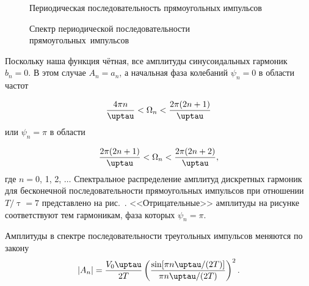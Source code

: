 
\begin{figure}[h!]
\begin{minipage}{0.45\textwidth}
	\caption{Периодическая последовательность прямоугольных импульсов}
\end{minipage}
\hfill
\begin{minipage}{0.45\textwidth}
	\caption{Спектр периодической последовательности прямоугольных~импульсов}
\end{minipage}
\end{figure}

Поскольку наша функция чётная, все амплитуды синусоидальных гармоник $b_n=0$. В этом случае $A_n=a_n$, а начальная фаза
колебаний $\psi_n=0$ в области частот

\begin{equation}
	\frac{4\pi n}{\uptau}<\Omega_n<\frac{2\pi (2n+1)}{\uptau}
	\eqmark{6.2.3}
\end{equation}
или $\psi_n=\pi$ в области

\begin{equation}
	\frac{2\pi(2n+1)}{\uptau} < \Omega_n < \frac{2\pi (2n+2)}{\uptau},
	\eqmark{6.2.4}
\end{equation}
где $n=0$, 1, 2, $\dots$ Спектральное распределение амплитуд дискретных гармоник для бесконечной последовательности прямоугольных импульсов при отношении $T/\uptau=7$ представлено на рис.~.
<<Отрицательные>> амплитуды на рисунке соответствуют тем гармоникам, фаза которых $\psi_n=\pi$.


Амплитуды в спектре последовательности треугольных импульсов меняются по закону
\begin{equation}
	|A_n|=\frac{V_0\uptau}{2T} \left(\frac{\sin[\pi n\uptau/(2T)]} {\pi n\uptau/(2T)}\right)^2.
	\eqmark{6.2.5}
\end{equation}

